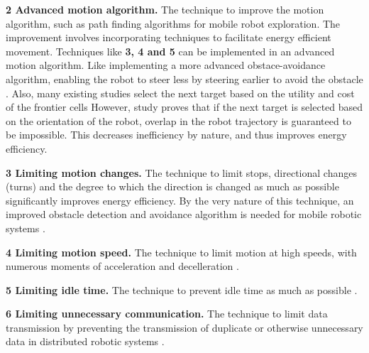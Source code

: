 \vspace{2mm}

\textbf{2 Advanced motion algorithm.} The technique to improve the motion algorithm, such as path finding algorithms for mobile robot exploration. 
The improvement involves incorporating techniques to facilitate energy efficient movement.
Techniques like \textbf{3, 4 and 5} can be implemented in an advanced motion algorithm.
Like implementing a more advanced obstace-avoidance algorithm, enabling the robot to steer less by steering earlier to avoid the obstacle \cite{xie2018mecanum_wheel}.
Also, many existing studies select the next target based on the utility and cost of the frontier cells 
\cite{burgard2005multi_robot_exploration, simmons2000multi_robot_exploration,zlot2002multi_robot_exploration} 
However, study \cite{mei2006mobile_exploration} proves that if the next target is selected based on the orientation of the robot, 
overlap in the robot trajectory is guaranteed to be impossible. This decreases inefficiency by nature, and thus improves energy 
efficiency.
    
\vspace{2mm}

\textbf{3 Limiting motion changes.} The technique to limit stops, directional changes (turns) and the degree to which the direction is changed as much as possible 
significantly improves energy efficiency. By the very nature of this technique, an improved obstacle detection and avoidance algorithm
is needed for mobile robotic systems
\cite{xie2018mecanum_wheel, kim2016firefighting_robot, benkrid2016multi_robot_exploration, barili1995efficient_motion, 
jia2004grid_strategy_exploration, mei2005energy_consumers_identified, patel2012exploration_strategy}.
    
\vspace{2mm}

\textbf{4 Limiting motion speed.} The technique to limit motion at high speeds, with numerous moments of acceleration and decelleration
\cite{wingstrom2013robot_cell_scheduling}.
    
\vspace{2mm}

\textbf{5 Limiting idle time.} The technique to prevent idle time as much as possible \cite{gurel2019industrial_robot_scheduling, 
kaitwanidvilai2020industrial_robot_cycle_time, wingstrom2013robot_cell_scheduling}.
    
\vspace{2mm}

\textbf{6 Limiting unnecessary communication.} The technique to limit data transmission by preventing the transmission of duplicate 
or otherwise unnecessary data in distributed robotic systems \cite{huh2013distributed_swarm}.

